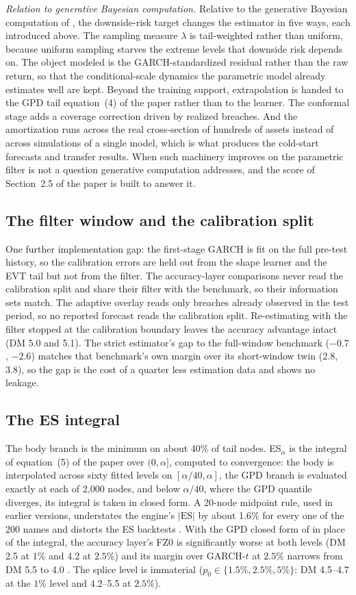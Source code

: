 \documentclass[11pt]{article}
\newcommand{\ES}{\mathrm{ES}}
\begin{document}
\noindent\emph{Relation to generative Bayesian computation.} Relative to the generative Bayesian computation of \citet{polson2023gbc}, the downside-risk target changes the estimator in five ways, each introduced above. The sampling measure $\lambda$ is tail-weighted rather than uniform, because uniform sampling starves the extreme levels that downside risk depends on. The object modeled is the GARCH-standardized residual rather than the raw return, so that the conditional-scale dynamics the parametric model already estimates well are kept. Beyond the training support, extrapolation is handed to the GPD tail equation~(4) of the paper rather than to the learner. The conformal stage adds a coverage correction driven by realized breaches. And the amortization runs across the real cross-section of hundreds of assets instead of across simulations of a single model, which is what produces the cold-start forecasts and transfer results. When such machinery improves on the parametric filter is not a question generative computation addresses, and the score of Section~2.5 of the paper is built to answer it.

\subsection*{The filter window and the calibration split}
One further
implementation gap: the first-stage
GARCH is fit on the full pre-test history, so the calibration errors
are held out from the shape learner and the EVT tail but not from the
filter. The accuracy-layer comparisons never read the calibration split
and share their filter with the benchmark, so their information sets
match. The adaptive overlay reads only breaches already observed in the test period, so no reported forecast reads the calibration split. Re-estimating with the filter stopped at the calibration boundary leaves the accuracy advantage intact (DM 5.0 and 5.1). The strict estimator's gap to the full-window benchmark ($-0.7$, $-2.6$) matches that benchmark's own margin over its short-window twin (2.8, 3.8), so the gap is the cost of a quarter less estimation data and shows no leakage.

\subsection*{The ES integral}
The body branch is the minimum on about 40\% of tail nodes. ES$_\alpha$ is the integral of equation~(5) of the paper over $(0,\alpha]$, computed to convergence: the body is interpolated across sixty fitted levels on $[\alpha/40,\alpha]$, the GPD branch is evaluated exactly at each of 2{,}000 nodes, and below $\alpha/40$, where the GPD quantile diverges, its integral is taken in closed form. A 20-node midpoint rule, used in earlier versions, understates the engine's $|\ES|$ by about 1.6\% for every one of the 200 names and distorts the ES backtests . With the GPD closed form of \citet{mcneilfrey2000} in place of the integral, the accuracy layer's FZ0 is significantly worse at both levels (DM 2.5 at $1\%$ and 4.2 at $2.5\%$) and its margin over GARCH-$t$ at $2.5\%$ narrows from DM 5.5 to 4.0 . The splice level is immaterial ($p_0\in\{1.5\%,2.5\%,5\%\}$: DM 4.5--4.7 at the $1\%$ level and 4.2--5.5 at $2.5\%$).
\end{document}
